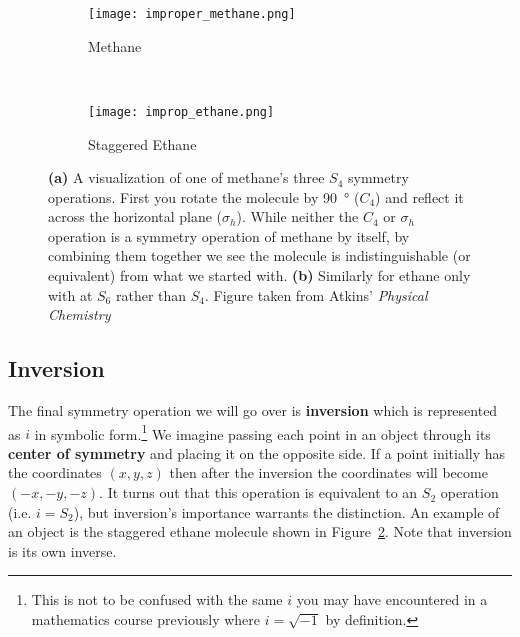         \begin{figure}[ht]
            \begin{center} 
            \begin{subfigure}[b]{0.35\textwidth}
                \texttt{[image: improper\_methane.png]}
                \caption{Methane}
                \label{fig:improp_methane}         
            \end{subfigure}
            ~
            \begin{subfigure}[b]{0.33\textwidth}
                \texttt{[image: improp\_ethane.png]}
                \caption{Staggered Ethane}
                \label{fig:improp_ethane}         
            \end{subfigure}
            \caption{\textbf{(a)} A visualization of one of methane's three $S_4$ symmetry operations. First you rotate the molecule by \SI{90}{\degree} ($C_4$) and reflect it across the horizontal plane ($\sigma_h$). While neither the $C_4$ or $\sigma_h$ operation is a symmetry operation of methane by itself, by combining them together we see the molecule is indistinguishable (or equivalent) from what we started with. \textbf{(b)} Similarly for ethane only with at $S_6$ rather than $S_4$. Figure taken from Atkins' \emph{Physical Chemistry} \citep{atkins2014physical}}
            \label{fig:improper}
            \end{center}
        \end{figure}
        


        \subsection*{Inversion} %
        \label{sub:inversion}
        The final symmetry operation we will go over is \textbf{inversion} which is represented as $i$ in symbolic form.\footnote{This is not to be confused with the same $i$ you may have encountered in a mathematics course previously where $i = \sqrt{-1}$ by definition.} We imagine passing each point in an object through its \textbf{center of symmetry} and placing it on the opposite side. If a point initially has the coordinates $(x,y,z)$ then after the inversion the coordinates will become $(-x,-y,-z).$ It turns out that this operation is equivalent to an $S_2$ operation (i.e. $i = S_2$), but inversion's importance warrants the distinction. An example of an object is the staggered ethane molecule shown in Figure~\ref{fig:improp_ethane}. Note that inversion is its own inverse.

